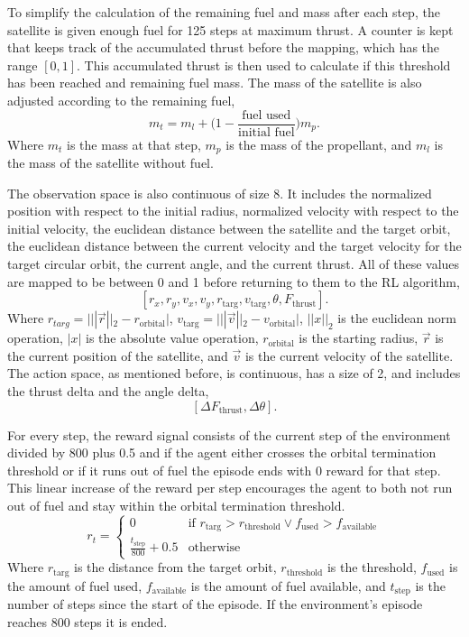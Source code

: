 To simplify the calculation of the remaining fuel and mass after each step, the satellite is given enough fuel for 125 steps at maximum thrust. A counter is kept that keeps track of the accumulated thrust before the mapping, which has the range $[0, 1]$. This accumulated thrust is then used to calculate if this threshold has been reached and remaining fuel mass. The mass of the satellite is also adjusted according to the remaining fuel, $$m_t=m_l+\bigg(1-\frac{\text{fuel used}}{\text{initial fuel}}\bigg)m_p.$$ Where $m_t$ is the mass at that step, $m_p$ is the mass of the propellant, and $m_l$ is the mass of the satellite without fuel.

The observation space is also continuous of size 8. It includes the normalized position with respect to the initial radius, normalized velocity with respect to the initial velocity, the euclidean distance between the satellite and the target orbit, the euclidean distance between the current velocity and the target velocity for the target circular orbit, the current angle, and the current thrust. All of these values are mapped to be between 0 and 1 before returning to them to the RL algorithm,
$$[r_x, r_y, v_x, v_y, r_{\text{targ}}, v_{\text{targ}}, \theta, F_{\text{thrust}}].$$
Where $r_{targ}=|||\vec{r}||_2 - r_\text{orbital}|$, $v_{\text{targ}}=|||\vec{v}||_2-v_\text{orbital}|$, $||x||_2$ is the euclidean norm operation, $|x|$ is the absolute value operation, $r_\text{orbital}$ is the starting radius, $\vec{r}$ is the current position of the satellite, and $\vec{v}$ is the current velocity of the satellite. The action space, as mentioned before, is continuous, has a size of 2, and includes the thrust delta and the angle delta, $$[\Delta F_{\text{thrust}}, \Delta \theta].$$ 

For every step, the reward signal consists of the current step of the environment divided by 800 plus 0.5 and if the agent either crosses the orbital termination threshold or if it runs out of fuel the episode ends with 0 reward for that step. This linear increase of the reward per step encourages the agent to both not run out of fuel and stay within the orbital termination threshold. \begin{equation}\label{eq:reward}
r_t = \begin{cases}
	0 & \mbox{if }r_{\text{targ}}>r_{\text{threshold}}\lor f_{\text{used}}>f_{\text{available}} \\
	\frac{t_{\text{step}}}{800} + 0.5 & \mbox{otherwise}
\end{cases}
\end{equation}
Where $r_{\text{targ}}$ is the distance from the target orbit, $r_{\text{threshold}}$ is the threshold, $f_{\text{used}}$ is the amount of fuel used, $f_{\text{available}}$ is the amount of fuel available, and $t_{\text{step}}$ is the number of steps since the start of the episode. If the environment's episode reaches 800 steps it is ended. 

